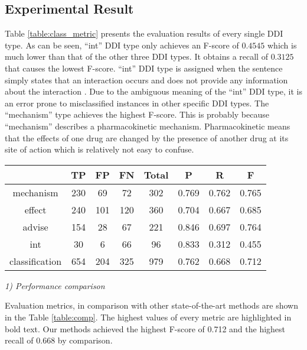 \documentclass[conference]{IEEEtran}
\begin{document}
\subsection{Experimental Result}

Table \ref{table:class_metric} presents the evaluation results of every single DDI type.
As can be seen, ``int'' DDI type only achieves an F-score of $0.4545$ which is much lower than that of the other three DDI types.
It obtains a recall of $0.3125$ that causes the lowest F-score.
``int'' DDI type is assigned when the sentence simply states that an interaction occurs
and does not provide any information about the interaction \cite{segura-bedmar_semeval-2013_2013}.
Due to the ambiguous meaning of the ``int'' DDI type, it is an error prone to misclassified instances in other specific DDI types.
The ``mechanism'' type achieves the highest F-score. This is probably because ``mechanism'' describes a pharmacokinetic mechanism.
Pharmacokinetic means that the effects of one drug are changed by the presence of another drug at its site of action which is relatively not easy to confuse.

\begin{table*}
\caption{Detailed evaluation metrics of DDI-UGC.}
\normalsize
\label{table:class_metric}
\begin{center}
\begin{tabular}{cccccccc}
\hline
& TP & FP & FN & Total &P & R & F \\\hline
mechanism &  230 & 69 & 72 & 302 & 0.769 & 0.762 & 0.765\\
effect &  240 & 101 & 120 & 360 & 0.704 & 0.667 & 0.685\\
advise &  154 & 28 & 67 & 221 & 0.846 & 0.697 & 0.764 \\
int &  30 & 6 & 66 & 96 & 0.833 & 0.312 & 0.455\\
classification & 654 & 204 & 325 & 979 & 0.762 & 0.668 & 0.712\\
\hline
\end{tabular}
\end{center}
\end{table*}

\bigbreak
\emph{1) Performance comparison}
\bigbreak

Evaluation metrics, in comparison with other state-of-the-art methods are shown in the Table \ref{table:comp}.
The highest values of every metric are highlighted in bold text.
Our methods achieved the highest F-score of 0.712 and the highest recall of 0.668 by comparison.
\end{document}
